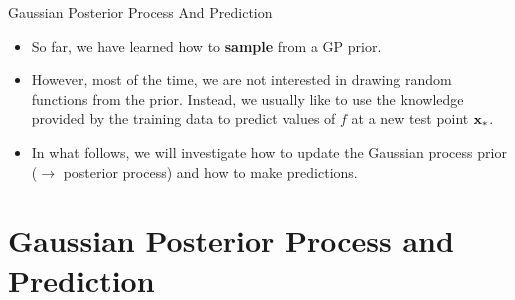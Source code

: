 \documentclass[11pt,compress,t,notes=noshow, xcolor=table]{beamer}
\begin{document}

\begin{vbframe}{Gaussian Posterior Process And Prediction}

\vspace*{1cm}

\begin{itemize}
  \item So far, we have learned how to \textbf{sample} from a GP prior.
\item However, most of the time, we are not interested in drawing random functions from the prior. Instead, we usually like to use the knowledge provided by the training data to predict values of $f$ at a new test point $\mathbf{x}_*$. 
\item In what follows, we will investigate how to update the Gaussian process prior ($\to$ posterior process) and how to make predictions.
\end{itemize}

\end{vbframe}

\section{Gaussian Posterior Process and Prediction}
\end{document}
